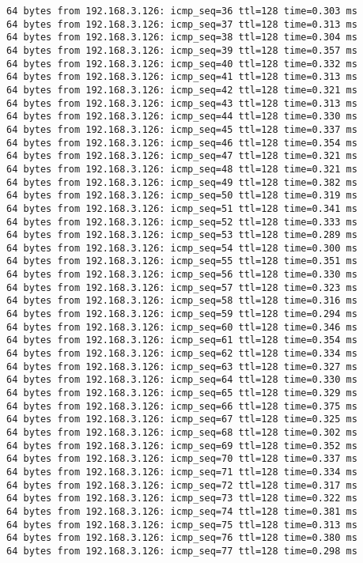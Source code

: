 \begin{lstlisting}[frame=single, caption={The Ping test with OVS}, label={lst:Pingtest_with_OVS}]
64 bytes from 192.168.3.126: icmp_seq=36 ttl=128 time=0.303 ms
64 bytes from 192.168.3.126: icmp_seq=37 ttl=128 time=0.313 ms
64 bytes from 192.168.3.126: icmp_seq=38 ttl=128 time=0.304 ms
64 bytes from 192.168.3.126: icmp_seq=39 ttl=128 time=0.357 ms
64 bytes from 192.168.3.126: icmp_seq=40 ttl=128 time=0.332 ms
64 bytes from 192.168.3.126: icmp_seq=41 ttl=128 time=0.313 ms
64 bytes from 192.168.3.126: icmp_seq=42 ttl=128 time=0.321 ms
64 bytes from 192.168.3.126: icmp_seq=43 ttl=128 time=0.313 ms
64 bytes from 192.168.3.126: icmp_seq=44 ttl=128 time=0.330 ms
64 bytes from 192.168.3.126: icmp_seq=45 ttl=128 time=0.337 ms
64 bytes from 192.168.3.126: icmp_seq=46 ttl=128 time=0.354 ms
64 bytes from 192.168.3.126: icmp_seq=47 ttl=128 time=0.321 ms
64 bytes from 192.168.3.126: icmp_seq=48 ttl=128 time=0.321 ms
64 bytes from 192.168.3.126: icmp_seq=49 ttl=128 time=0.382 ms
64 bytes from 192.168.3.126: icmp_seq=50 ttl=128 time=0.319 ms
64 bytes from 192.168.3.126: icmp_seq=51 ttl=128 time=0.341 ms
64 bytes from 192.168.3.126: icmp_seq=52 ttl=128 time=0.333 ms
64 bytes from 192.168.3.126: icmp_seq=53 ttl=128 time=0.289 ms
64 bytes from 192.168.3.126: icmp_seq=54 ttl=128 time=0.300 ms
64 bytes from 192.168.3.126: icmp_seq=55 ttl=128 time=0.351 ms
64 bytes from 192.168.3.126: icmp_seq=56 ttl=128 time=0.330 ms
64 bytes from 192.168.3.126: icmp_seq=57 ttl=128 time=0.323 ms
64 bytes from 192.168.3.126: icmp_seq=58 ttl=128 time=0.316 ms
64 bytes from 192.168.3.126: icmp_seq=59 ttl=128 time=0.294 ms
64 bytes from 192.168.3.126: icmp_seq=60 ttl=128 time=0.346 ms
64 bytes from 192.168.3.126: icmp_seq=61 ttl=128 time=0.354 ms
64 bytes from 192.168.3.126: icmp_seq=62 ttl=128 time=0.334 ms
64 bytes from 192.168.3.126: icmp_seq=63 ttl=128 time=0.327 ms
64 bytes from 192.168.3.126: icmp_seq=64 ttl=128 time=0.330 ms
64 bytes from 192.168.3.126: icmp_seq=65 ttl=128 time=0.329 ms
64 bytes from 192.168.3.126: icmp_seq=66 ttl=128 time=0.375 ms
64 bytes from 192.168.3.126: icmp_seq=67 ttl=128 time=0.325 ms
64 bytes from 192.168.3.126: icmp_seq=68 ttl=128 time=0.302 ms
64 bytes from 192.168.3.126: icmp_seq=69 ttl=128 time=0.352 ms
64 bytes from 192.168.3.126: icmp_seq=70 ttl=128 time=0.337 ms
64 bytes from 192.168.3.126: icmp_seq=71 ttl=128 time=0.334 ms
64 bytes from 192.168.3.126: icmp_seq=72 ttl=128 time=0.317 ms
64 bytes from 192.168.3.126: icmp_seq=73 ttl=128 time=0.322 ms
64 bytes from 192.168.3.126: icmp_seq=74 ttl=128 time=0.381 ms
64 bytes from 192.168.3.126: icmp_seq=75 ttl=128 time=0.313 ms
64 bytes from 192.168.3.126: icmp_seq=76 ttl=128 time=0.380 ms
64 bytes from 192.168.3.126: icmp_seq=77 ttl=128 time=0.298 ms

\end{lstlisting}
